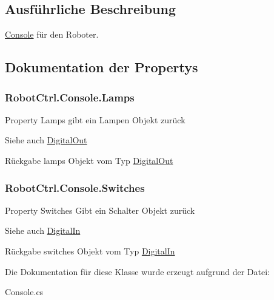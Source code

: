 \subsection{Ausführliche Beschreibung}
\hyperlink{class_robot_ctrl_1_1_console}{Console} f\"{u}r den Roboter. 

\subsection{Dokumentation der Propertys}
\hypertarget{class_robot_ctrl_1_1_console_a8d77cea764f4a4e2c4692e5776b7ded8}{
\subsubsection[{Lamps}]{ RobotCtrl.Console.Lamps}}
\label{class_robot_ctrl_1_1_console_a8d77cea764f4a4e2c4692e5776b7ded8}
Property Lamps gibt ein Lampen Objekt zur\"{u}ck \begin{DoxySeeAlso}{Siehe auch}
\hyperlink{class_robot_ctrl_1_1_digital_out}{DigitalOut}
\end{DoxySeeAlso}
\begin{DoxyReturn}{Rückgabe}
lamps Objekt vom Typ \hyperlink{class_robot_ctrl_1_1_digital_out}{DigitalOut} 
\end{DoxyReturn}
\hypertarget{class_robot_ctrl_1_1_console_a6bda1a70d35ecd46bdf21be13745932c}{
\subsubsection[{Switches}]{ RobotCtrl.Console.Switches}}
\label{class_robot_ctrl_1_1_console_a6bda1a70d35ecd46bdf21be13745932c}
Property Switches Gibt ein Schalter Objekt zur\"{u}ck \begin{DoxySeeAlso}{Siehe auch}
\hyperlink{class_robot_ctrl_1_1_digital_in}{DigitalIn}
\end{DoxySeeAlso}
\begin{DoxyReturn}{Rückgabe}
switches Objekt vom Typ \hyperlink{class_robot_ctrl_1_1_digital_in}{DigitalIn} 
\end{DoxyReturn}


Die Dokumentation für diese Klasse wurde erzeugt aufgrund der Datei:\begin{DoxyCompactItemize}
\item 
Console.cs\end{DoxyCompactItemize}
